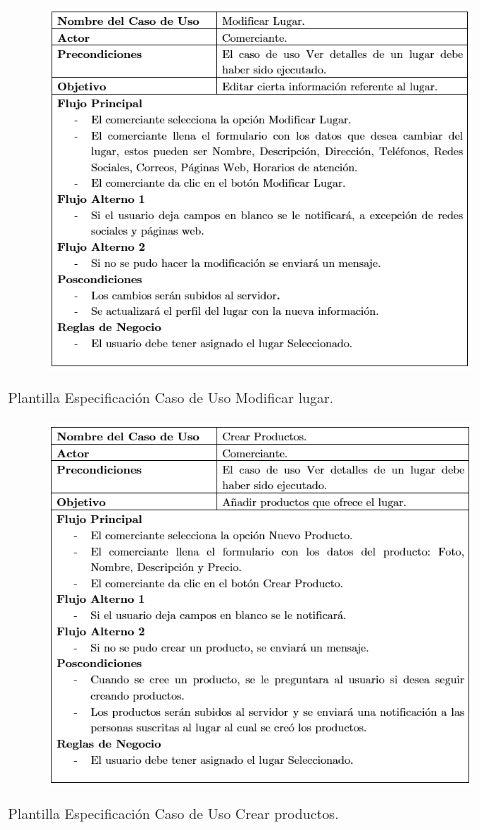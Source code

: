 \documentclass[12pt,letterpaper,openany]{book}
\begin{document}
\begin{table}[H]
\begin{center}
\begin{figure}[H]
\begin{center}
\includegraphics[width=13cm]{./imagenes/PCU/modificar_lugar}
\end{center}
\end{figure}
\end{center}
\caption{Plantilla Especificación Caso de Uso Modificar lugar.}
\end{table}

\begin{table}[H]
\begin{center}
\begin{figure}[H]
\begin{center}
\includegraphics[width=13cm]{./imagenes/PCU/crear_productos}
\end{center}
\end{figure}
\end{center}
\caption{Plantilla Especificación Caso de Uso Crear productos.}
\end{table}
\end{document}
